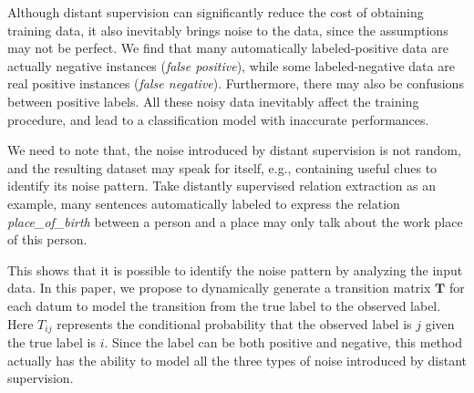 
Although distant supervision can significantly reduce the cost of obtaining training data, it also inevitably brings noise to the data, since the assumptions may not be perfect.   We find that many automatically labeled-positive data are actually negative instances (\emph{false positive}), while some labeled-negative data are real positive instances (\emph{false negative}). Furthermore, there may also be confusions between positive labels. All these noisy data inevitably affect the training procedure, and lead to a classification model with inaccurate performances.  

We need to note that, the noise introduced by distant supervision is not random, and the resulting dataset may speak for itself, e.g.,  containing useful clues to identify its noise pattern. Take distantly supervised relation extraction as an example, many sentences automatically labeled to express the relation \emph{place\_of\_birth} between a person and a place may only talk about the work place of this person.  

This shows that it is possible to identify the noise pattern by analyzing the input data. In this paper, we propose to dynamically generate a transition matrix $\mathbf{T}$ for each datum to model the transition from the true label to the observed label. Here $T_{ij}$ represents the conditional probability that the observed label is $j$ given the true label is $i$. Since the label  can be both positive and negative, this method actually has the ability to model all the three types of noise introduced by distant supervision. 

